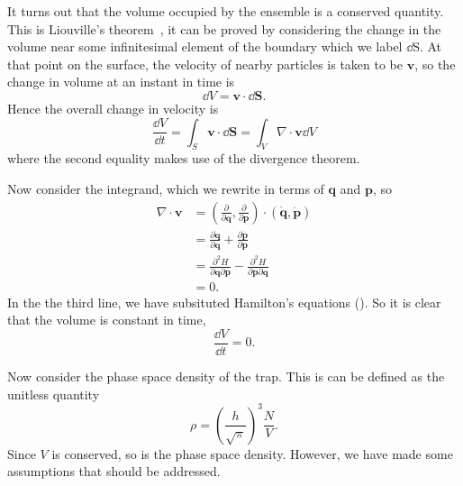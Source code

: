 It turns out that the volume occupied by the ensemble is a conserved quantity.
This is Liouville's theorem~\cite{Landau1982}, it can be proved by considering
the change in the volume near some infinitesimal element of the boundary which
we label $\dd \mathrm{S}$. At that point on the surface, the velocity of nearby
particles is taken to be $\mathbf{v}$, so the change in volume at an instant in
time is~\cite{Hand1998}
%
\begin{equation}
  \dd V = \mathbf{v} \cdot \dd \mathbf{S}.
\end{equation}
%
Hence the overall change in velocity is
%
\begin{equation}
  \frac{\dd V}{\dd t} = \int_S \mathbf{v} \cdot \dd \mathbf{S} = \int_V \nabla 
  \cdot \mathbf{v} \dd V
\end{equation}
where the second equality makes use of the divergence theorem.

Now consider the integrand, which we rewrite in terms of $\mathbf{q}$ and
$\mathbf{p}$, so
%
\begin{align}
  \nabla \cdot \mathbf{v} &= \left(\frac{\partial}{\partial \mathbf{q}},
  \frac{\partial}{\partial \mathbf{p}}\right) \cdot \left(\dot{\mathbf{q}},
  \dot{\mathbf{p}}\right) \\
  &= \frac{\partial \dot{\mathbf{q}}}{\partial \mathbf{q}} +
  \frac{\partial \dot{\mathbf{p}}}{\partial \mathbf{p}} \\
  & = \frac{\partial^2 H}{\partial \mathbf{q} \partial \mathbf{p}}
  - \frac{\partial^2 H}{\partial \mathbf{p} \partial \mathbf{q}} \\
  & = 0.
\end{align}
In the the third line, we have subsituted Hamilton's equations
().  So it is clear that the volume is constant in
time,
%
\begin{equation}
  \frac{\dd V}{\dd t} = 0.
\end{equation}

Now consider the phase space density of the trap. This is can be defined as the
unitless quantity~\cite{PhysRevA.52.1423}
%
\begin{equation}
  \rho = \left(\frac{h}{\sqrt{\pi}}\right)^3 \frac{N}{V}.
\end{equation}
%
Since $V$ is conserved, so is the phase space density. However, we have made
some assumptions that should be addressed.

